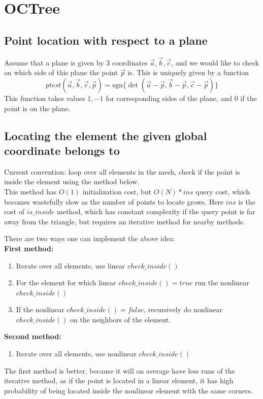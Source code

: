 \section{OCTree}
\label{theory-octree}

\subsection{Point location with respect to a plane}

Assume that a plane is given by 3 coordinates $\vec{a}, \vec{b}, \vec{c}$, and we would like to check on which side of this plane the point $\vec{p}$ is. This is uniquely given by a function
\begin{equation}
\label{equation-point-plane-test}
	ptest(\vec{a}, \vec{b}, \vec{c}, \vec{p}) = \mathrm{sgn} \{ \det (\vec{a} - \vec{p}, \vec{b} - \vec{p}, \vec{c} - \vec{p}) \}
\end{equation}
\noindent
This function takes values $1,-1$ for corresponding sides of the plane, and $0$ if the point is on the plane.

\subsection{Locating the element the given global coordinate belongs to}
\label{subsection-locating-element}

\noindent
Current convention: loop over all elements in the mesh, check if the point is inside the element using the method below. \\


\noindent
This method has $O(1)$ initialization cost, but $O(N) * ins$ query cost, which becomes wastefully slow as the number of points to locate grows. Here $ins$ is the cost of $is\_inside$ method, which has constant complexity if the query point is far away from the triangle, but requires an iterative method for nearby methods.

\noindent
There are two ways one can implement the above idea: \\
\textbf{First method:}
\begin{enumerate}
	\item Iterate over all elements, use linear $check\_inside()$
	\item For the element for which linear $check\_inside() = true$ run the nonlinear $check\_inside()$
	\item If the nonlinear $check\_inside() = false$, recursively do nonlinear $check\_inside()$ on the neighbors of the element.
\end{enumerate}
\textbf{Second method:}
\begin{enumerate}
	\item Iterate over all elements, use nonlinear $check\_inside()$
\end{enumerate}
\noindent
The first method is better, because it will on average have less runs of the iterative method, as if the point is located in a linear element, it has high probability of being located inside the nonlinear element with the same corners. \\

